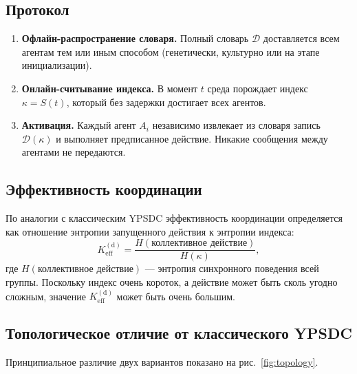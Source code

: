 \documentclass[11pt,a4paper]{article}
\newcommand{\Keff}{K_{\mathrm{eff}}}
\begin{document}
	\subsection{Протокол}
	
	\begin{enumerate}[leftmargin=*, label=\textbf{Этап \arabic*:}]
		\item \textbf{Офлайн-распространение словаря.} Полный словарь \(\mathcal{D}\) доставляется всем агентам тем или иным способом (генетически, культурно или на этапе инициализации).
		\item \textbf{Онлайн-считывание индекса.} В момент \(t\) среда порождает индекс \(\kappa = S(t)\), который без задержки достигает всех агентов.
		\item \textbf{Активация.} Каждый агент \(A_i\) независимо извлекает из словаря запись \(\mathcal{D}(\kappa)\) и выполняет предписанное действие. Никакие сообщения между агентами не передаются.
	\end{enumerate}
	
	\subsection{Эффективность координации}
	
	По аналогии с классическим YPSDC эффективность координации определяется как отношение энтропии запущенного действия к энтропии индекса:
	\begin{equation}
		\Keff^{\mathrm{(d)}} = \frac{H(\text{коллективное действие})}{H(\kappa)},
		\label{eq:Keff_d}
	\end{equation}
	где \(H(\text{коллективное действие})\) — энтропия синхронного поведения всей группы. Поскольку индекс очень короток, а действие может быть сколь угодно сложным, значение \(\Keff^{\mathrm{(d)}}\) может быть очень большим.
	
	\subsection{Топологическое отличие от классического YPSDC}
	
	Принципиальное различие двух вариантов показано на рис.~\ref{fig:topology}.
	
\end{document}
